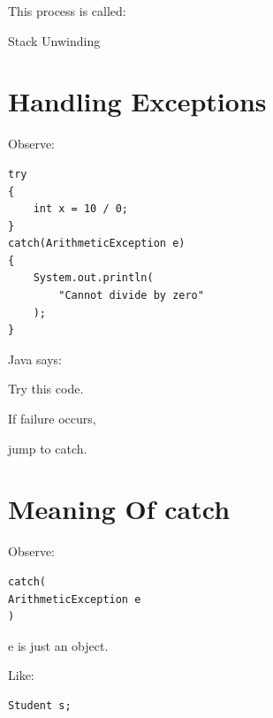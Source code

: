 \documentclass[11pt,a4paper]{book}
\begin{document}

This process is called:


Stack Unwinding


\section{Handling Exceptions}

Observe:

\begin{verbatim} 
try
{
    int x = 10 / 0;
}
catch(ArithmeticException e)
{
    System.out.println(
        "Cannot divide by zero"
    );
}
\end{verbatim}


Java says:


Try this code.


If failure occurs,

jump to catch.


\section{Meaning Of catch}

Observe:

\begin{verbatim} 
catch(
ArithmeticException e
)
\end{verbatim}


e is just an object.


Like:

\begin{verbatim} 
Student s;
\end{verbatim}

\end{document}
